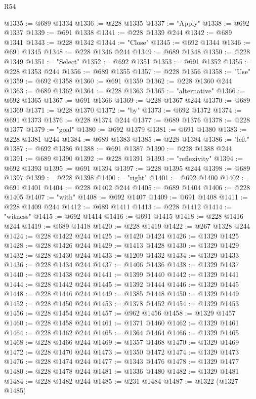 \begin{lexlean}{R54}
\begin{coremodule}
@1335 := @689 @1334
@1336 := @228 @1335
@1337 := "Apply"
@1338 := @692 @1337
@1339 := @691 @1338
@1341 := @228 @1339 @244
@1342 := @689 @1341
@1343 := @228 @1342
@1344 := "Close"
@1345 := @692 @1344
@1346 := @691 @1345
@1348 := @228 @1346 @244
@1349 := @689 @1348
@1350 := @228 @1349
@1351 := "Select"
@1352 := @692 @1351
@1353 := @691 @1352
@1355 := @228 @1353 @244
@1356 := @689 @1355
@1357 := @228 @1356
@1358 := "Use"
@1359 := @692 @1358
@1360 := @691 @1359
@1362 := @228 @1360 @244
@1363 := @689 @1362
@1364 := @228 @1363
@1365 := "alternative"
@1366 := @692 @1365
@1367 := @691 @1366
@1369 := @228 @1367 @244
@1370 := @689 @1369
@1371 := @228 @1370
@1372 := "by"
@1373 := @692 @1372
@1374 := @691 @1373
@1376 := @228 @1374 @244
@1377 := @689 @1376
@1378 := @228 @1377
@1379 := "goal"
@1380 := @692 @1379
@1381 := @691 @1380
@1383 := @228 @1381 @244
@1384 := @689 @1383
@1385 := @228 @1384
@1386 := "left"
@1387 := @692 @1386
@1388 := @691 @1387
@1390 := @228 @1388 @244
@1391 := @689 @1390
@1392 := @228 @1391
@1393 := "reflexivity"
@1394 := @692 @1393
@1395 := @691 @1394
@1397 := @228 @1395 @244
@1398 := @689 @1397
@1399 := @228 @1398
@1400 := "right"
@1401 := @692 @1400
@1402 := @691 @1401
@1404 := @228 @1402 @244
@1405 := @689 @1404
@1406 := @228 @1405
@1407 := "with"
@1408 := @692 @1407
@1409 := @691 @1408
@1411 := @228 @1409 @244
@1412 := @689 @1411
@1413 := @228 @1412
@1414 := "witness"
@1415 := @692 @1414
@1416 := @691 @1415
@1418 := @228 @1416 @244
@1419 := @689 @1418
@1420 := @228 @1419
@1422 := @267 @1328 @244
@1424 := @228 @1422 @244
@1425 := @1420 @1424
@1426 := @1329 @1425
@1428 := @228 @1426 @244
@1429 := @1413 @1428
@1430 := @1329 @1429
@1432 := @228 @1430 @244
@1433 := @1209 @1432
@1434 := @1329 @1433
@1436 := @228 @1434 @244
@1437 := @1406 @1436
@1438 := @1329 @1437
@1440 := @228 @1438 @244
@1441 := @1399 @1440
@1442 := @1329 @1441
@1444 := @228 @1442 @244
@1445 := @1392 @1444
@1446 := @1329 @1445
@1448 := @228 @1446 @244
@1449 := @1385 @1448
@1450 := @1329 @1449
@1452 := @228 @1450 @244
@1453 := @1378 @1452
@1454 := @1329 @1453
@1456 := @228 @1454 @244
@1457 := @962 @1456
@1458 := @1329 @1457
@1460 := @228 @1458 @244
@1461 := @1371 @1460
@1462 := @1329 @1461
@1464 := @228 @1462 @244
@1465 := @1364 @1464
@1466 := @1329 @1465
@1468 := @228 @1466 @244
@1469 := @1357 @1468
@1470 := @1329 @1469
@1472 := @228 @1470 @244
@1473 := @1350 @1472
@1474 := @1329 @1473
@1476 := @228 @1474 @244
@1477 := @1343 @1476
@1478 := @1329 @1477
@1480 := @228 @1478 @244
@1481 := @1336 @1480
@1482 := @1329 @1481
@1484 := @228 @1482 @244
@1485 := @231 @1484
@1487 := @1322 (@1327 @1485)

\end{coremodule}
\end{lexlean}
